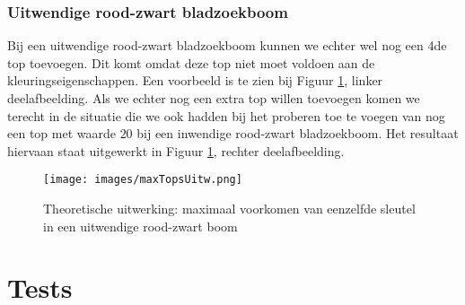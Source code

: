 \documentclass[11pt,a4paper]{report}
\begin{document}
\subsubsection*{Uitwendige rood-zwart bladzoekboom}
Bij een uitwendige rood-zwart bladzoekboom kunnen we echter wel nog een 4de top toevoegen. Dit komt omdat deze top niet moet voldoen aan de kleuringseigenschappen. Een voorbeeld is te zien bij Figuur \ref{maxTopsUitw}, linker deelafbeelding. Als we echter nog een extra top willen toevoegen komen we terecht in de situatie die we ook hadden bij het proberen toe te voegen van nog een top met waarde $20$ bij een inwendige rood-zwart bladzoekboom. Het resultaat hiervaan staat uitgewerkt in Figuur \ref{maxTopsUitw}, rechter deelafbeelding.
\begin{figure}[h!]
	\centering
		\texttt{[image: images/maxTopsUitw.png]}
	\caption{Theoretische uitwerking: maximaal voorkomen van eenzelfde sleutel in een uitwendige rood-zwart boom}
	\label{maxTopsUitw}
\end{figure}

\section{Tests}
\end{document}
